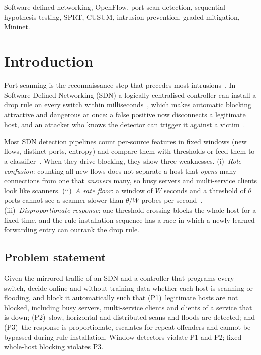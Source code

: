 \documentclass[conference]{IEEEtran}
\begin{document}
\begin{IEEEkeywords}
Software-defined networking, OpenFlow, port scan detection, sequential hypothesis testing, SPRT, CUSUM, intrusion
prevention, graded mitigation, Mininet.
\end{IEEEkeywords}

\section{Introduction}
Port scanning is the reconnaissance step that precedes most intrusions~\cite{bhuyan2014anomaly,pittman2023ml}. In
Software-Defined Networking (SDN) a logically centralised controller can install a drop rule on every switch within
milliseconds~\cite{mckeown2008openflow,kreutz2015sdn}, which makes automatic blocking attractive and dangerous at once: a
false positive now disconnects a legitimate host, and an attacker who knows the detector can trigger it against a
victim~\cite{hong2015poisoning,scotthayward2016survey}.

Most SDN detection pipelines count per-source features in fixed windows (new flows, distinct ports, entropy) and compare
them with thresholds or feed them to a classifier~\cite{braga2010lightweight,giotis2014combining,tang2016deep,belachew2025robust}.
When they drive blocking, they show three weaknesses. (i)~\emph{Role confusion}: counting all new flows does not separate a
host that \emph{opens} many connections from one that \emph{answers} many, so busy servers and multi-service clients look
like scanners. (ii)~\emph{A rate floor}: a window of $W$ seconds and a threshold of $\theta$ ports cannot see a scanner
slower than $\theta/W$ probes per second~\cite{ring2018slow}. (iii)~\emph{Disproportionate response}: one threshold crossing
blocks the whole host for a fixed time, and the rule-installation sequence has a race in which a newly learned forwarding
entry can outrank the drop rule.

\subsection*{Problem statement}
Given the mirrored traffic of an SDN and a controller that programs every switch, decide online and without training data
whether each host is scanning or flooding, and block it automatically such that (P1)~legitimate hosts are not blocked,
including busy servers, multi-service clients and clients of a service that is down; (P2)~slow, horizontal and
distributed scans and floods are detected; and (P3)~the response is proportionate, escalates for repeat offenders and
cannot be bypassed during rule installation. Window detectors violate P1 and P2; fixed whole-host blocking violates P3.
\end{document}

